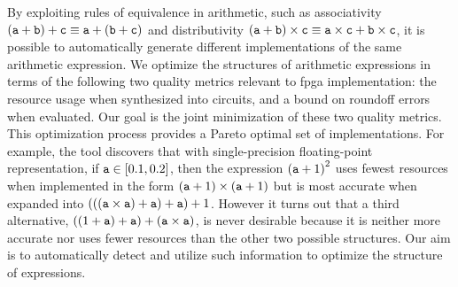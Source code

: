 
By exploiting rules of equivalence in arithmetic, such as associativity $(\texttt{a}
+ \texttt{b}) + \texttt{c} \equiv \texttt{a} + (\texttt{b} + \texttt{c})$ and distributivity $(\texttt{a}
+ \texttt{b}) \times \texttt{c} \equiv \texttt{a} \times \texttt{c} + \texttt{b} \times \texttt{c}$, it
is possible to automatically generate different implementations of the same
arithmetic expression.  We optimize the structures of arithmetic expressions
in terms of the following two quality metrics relevant to \gls{fpga}
implementation: the resource usage when synthesized into circuits, and a bound
on roundoff errors when evaluated. Our goal is the joint minimization of these
two quality metrics.  This optimization process provides a Pareto optimal set
of implementations.  For example, the tool discovers that with single-precision
floating-point representation, if $\texttt{a} \in [0.1, 0.2]$, then the expression
${(\texttt{a} + 1)}^2$ uses fewest resources when implemented in the form $(\texttt{a} +
1) \times (\texttt{a} + 1)$ but is most accurate when expanded into $(((\texttt{a} \times
\texttt{a}) + \texttt{a}) + \texttt{a}) + 1$.  However it turns out that a third alternative,
$((1 + \texttt{a}) + \texttt{a}) + (\texttt{a} \times \texttt{a})$, is never desirable because it
is neither more accurate nor uses fewer resources than the other two possible
structures. Our aim is to automatically detect and utilize such information to
optimize the structure of expressions.

